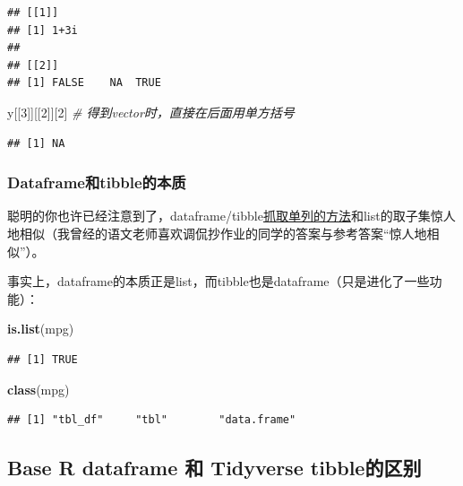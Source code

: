 \documentclass[]{book}
\newenvironment{Shaded}{\begin{snugshade}}{\end{snugshade}}
\newcommand{\CommentTok}[1]{\textcolor[rgb]{0.56,0.35,0.01}{\textit{#1}}}
\newcommand{\DecValTok}[1]{\textcolor[rgb]{0.00,0.00,0.81}{#1}}
\newcommand{\KeywordTok}[1]{\textcolor[rgb]{0.13,0.29,0.53}{\textbf{#1}}}
\newcommand{\NormalTok}[1]{#1}
\begin{document}
\begin{verbatim}
## [[1]]
## [1] 1+3i
## 
## [[2]]
## [1] FALSE    NA  TRUE
\end{verbatim}

\begin{Shaded}
\begin{Highlighting}[]
\NormalTok{y[[}\DecValTok{3}\NormalTok{]][[}\DecValTok{2}\NormalTok{]][}\DecValTok{2}\NormalTok{] }\CommentTok{# 得到vector时，直接在后面用单方括号}
\end{Highlighting}
\end{Shaded}

\begin{verbatim}
## [1] NA
\end{verbatim}

\hypertarget{dataframetibble}{%
\subsubsection{Dataframe和tibble的本质}\label{dataframetibble}}

聪明的你也许已经注意到了，dataframe/tibble\protect\hyperlink{single-column}{抓取单列的方法}和list的取子集惊人地相似（我曾经的语文老师喜欢调侃抄作业的同学的答案与参考答案``惊人地相似''）。

事实上，dataframe的本质正是list，而tibble也是dataframe（只是进化了一些功能）：

\begin{Shaded}
\begin{Highlighting}[]
\KeywordTok{is.list}\NormalTok{(mpg)}
\end{Highlighting}
\end{Shaded}

\begin{verbatim}
## [1] TRUE
\end{verbatim}

\begin{Shaded}
\begin{Highlighting}[]
\KeywordTok{class}\NormalTok{(mpg)}
\end{Highlighting}
\end{Shaded}

\begin{verbatim}
## [1] "tbl_df"     "tbl"        "data.frame"
\end{verbatim}

\hypertarget{base-r-dataframe--tidyverse-tibble}{%
\subsection{Base R dataframe 和 Tidyverse tibble的区别}\label{base-r-dataframe--tidyverse-tibble}}
\end{document}
